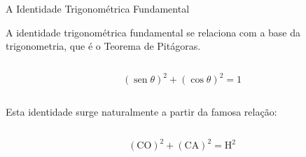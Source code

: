 \documentclass[aspectratio=169, t, 8pt]{beamer}
\DeclareMathOperator{\sen}{sen}
\begin{document}
    \begin{frame} {A Identidade Trigonométrica Fundamental}
        \vspace{1.2em}

        A identidade trigonométrica fundamental se relaciona com a base da trigonometria, que é o Teorema de Pitágoras.

        \begin{columns}[totalwidth=.9\textwidth]
            \begin{column}{\textwidth}
                {\Huge
                    \[
                        \left( \sen{\theta} \right)^2 + \left(\cos{\theta} \right)^2 = 1
                    \]
                }
            \end{column}
        \end{columns}
        \vspace{2em}
                Esta identidade surge naturalmente a partir da famosa relação:
        \begin{columns}[totalwidth=.9\textwidth]
            \begin{column}{\textwidth}
                {\Huge
                    \[
                        \left( \text{CO} \right)^2 + \left( \text{CA} \right)^2 = \text{H}^2
                    \]
                }
            \end{column}
        \end{columns}
    \end{frame}
\end{document}
